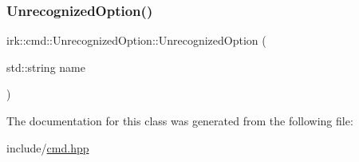 \subsubsection{\texorpdfstring{Unrecognized\+Option()}{UnrecognizedOption()}}
{\footnotesize\ttfamily irk\+::cmd\+::\+Unrecognized\+Option\+::\+Unrecognized\+Option (\begin{DoxyParamCaption}\item[{std\+::string}]{name }\end{DoxyParamCaption})\hspace{0.3cm}{\ttfamily [inline]}}



The documentation for this class was generated from the following file\+:\begin{DoxyCompactItemize}
\item 
include/\mbox{\hyperlink{cmd_8hpp}{cmd.\+hpp}}\end{DoxyCompactItemize}
